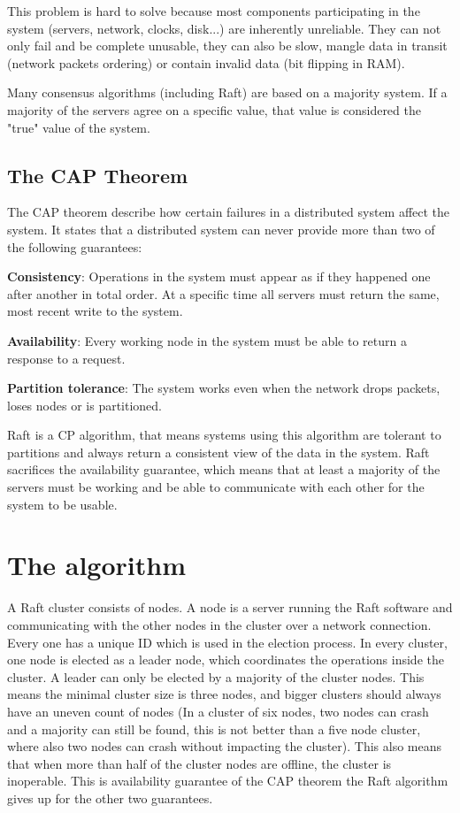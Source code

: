 This problem is hard to solve because most components participating in the system (servers, network, clocks, disk...) are inherently unreliable. They can not only fail and be complete unusable, they can also be slow, mangle data in transit (network packets ordering) or contain invalid data (bit flipping in RAM).

Many consensus algorithms (including Raft) are based on a majority system. If a majority of the servers agree on a specific value, that value is considered the "true" value of the system.

\subsection{The CAP Theorem}
The CAP theorem describe how certain failures in a distributed system affect the system. It states that a distributed system can never provide more than two of the following guarantees: \cite{cap_theorem}

\textbf{Consistency}: Operations in the system must appear as if they happened one after another in total order. At a specific time all servers must return the same, most recent write to the system.

\textbf{Availability}: Every working node in the system must be able to return a response to a request.

\textbf{Partition tolerance}: The system works even when the network drops packets, loses nodes or is partitioned.

Raft is a CP algorithm, that means systems using this algorithm are tolerant to partitions and always return a consistent view of the data in the system. Raft sacrifices the availability guarantee, which means that at least a majority of the servers must be working and be able to communicate with each other for the system to be usable.

\section{The algorithm}
A Raft cluster consists of nodes. A node is a server running the Raft software and communicating with the other nodes in the cluster over a network connection.
Every one has a unique ID which is used in the election process. In every cluster, one node is elected as a leader node, which coordinates the operations inside the cluster. A leader can only be elected by
a majority of the cluster nodes. This means the minimal cluster size is three nodes, and bigger clusters should always have an uneven count of nodes (In a cluster
of six nodes, two nodes can crash and a majority can still be found, this is not better than a five node cluster, where also two nodes can crash without impacting the cluster).
This also means that when more than half of the cluster nodes are offline, the cluster is inoperable.
This is availability guarantee of the CAP theorem the Raft algorithm gives up for the other two guarantees.

